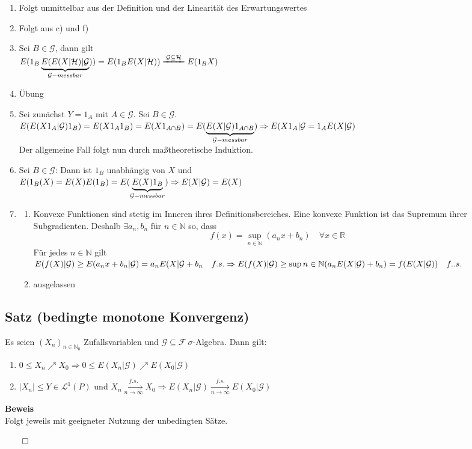 \documentclass[german,10pt,oneside, fleqn, a4paper]{article}
\newcommand {\R}	{\mathbb{R}}
\newcommand {\N}	{\mathbb{N}}
\newcommand{\Ra}	{\Rightarrow}
\newcommand{\folge}[3][\N]{\left(#2_#3\right)_{#3\in #1}}
\newcommand{\QED}{\begin{flushright}$\qed$\end{flushright}}
\newcommand{\mc}[1]{\mathcal{#1}}
\newcommand{\lp}[1]{\mc{L}^{#1}}
\newcommand{\beweis}{\textbf{Beweis}\\}
\newcommand{\toinf}{\rightarrow\infty}
\newcommand{\1}[1]{1_{#1}}
\newcommand{\2}[1]{\1{\brac{#1}}}
\newcommand{\xr}[2][]{\xrightarrow[#1]{#2}}
\newcommand{\g}{\mc{G}}
\newcommand{\f}{\mc{F}}
\begin{document}
\begin{enumerate}[label=(\alph*)]
\item Folgt unmittelbar aus der Definition und der Linearität des Erwartungswertes
\item Folgt aus c) und f)
\item Sei $B\in\g$, dann gilt\\
$E(1_B\underbrace{E(E(X|\mc{H})|\g}_{\g-messbar}))=E(1_BE(X|\mc{H}))\xlongequal{\g\subseteq\mc{H}}E(1_BX)$
\item Übung
\item Sei zunächst $Y=1_A$ mit $A\in\g$. Sei $B\in\g$.\\
$E(E(X1_A|\g)1_B)=E(X1_A1_B)=E(X1_{A\cap B})=E(\underbrace{E(X|\g)1_{A\cap B}}_{\mc{G}-messbar})\\
\Ra E(X1_A|\mc{G}=1_AE(X|\mc{G})$\\
Der allgemeine Fall folgt nun durch maßtheoretische Induktion.
\item Sei $B\in\mc{G}$: Dann ist $1_B$ unabhängig von $X$ und\\
$E(1_B(X)=E(X)E(1_B)=E(\underbrace{E(X)1_B}_{\mc{G}-messbar})\\
\Ra E(X|\mc{G})=E(X)$
\item \begin{enumerate}[label=(\roman*)]
	\item Konvexe Funktionen sind stetig im Inneren ihres Definitionsbereiches. Eine konvexe Funktion ist das Supremum ihrer Subgradienten. Deshalb $\exists a_n,b_n$ für $n\in\N$ so, dass \[
	f(x)=\sup\limits_{n\in\N}(a_nx+b_n)\quad\forall x\in\R\]
Für jedes $n\in\N$ gilt\\
$E(f(X)|\mc{G})\geq E(a_nx+b_n|\mc{G})=a_nE(X|\mc{G}+b_n\quad f.s.\\
\Ra E(f(X)|\mc{G})\geq\sup\limits{n\in\N}(a_nE(X|\mc{G})+b_n)=f(E(X|\mc{G}))\quad f..s.$
\item ausgelassen
\end{enumerate}
\end{enumerate}






\subsection{Satz (bedingte monotone Konvergenz)}
\label{6.3}
Es seien $\folge[\N_0]{X}{n}$ Zufallsvariablen und $\g\subseteq\f\ \sigma$-Algebra. Dann gilt: \begin{enumerate}[label=(\alph*)]
\item $0\leq X_n\nearrow X_0\Ra 0\leq E(X_n|\g)\nearrow E(X_0|\g)$
\item $|X_n|\leq Y\in\lp{1}(P)$ und $X_n\xr[n\toinf]{f.s.}X_0\Ra E(X_n|\g)\xr[n\toinf]{f.s.}E(X_0|\g)$\\
\end{enumerate}
\beweis
Folgt jeweils mit geeigneter Nutzung der unbedingten Sätze.\QED
\end{document}
